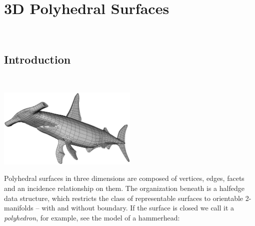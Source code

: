 
\ccParDims

\chapter{3D Polyhedral Surfaces}
\label{chapterPolyhedron}
\\

\vspace*{-15mm}
\minitoc
\vspace*{30mm}


\section{Introduction}
\label{sectionPolyIntro}

\begin{ccTexOnly}
    \vspace*{-50mm}
    \begin{flushright}~\hspace{1cm}
      \parbox{0.5\textwidth}{%
          \includegraphics[width=0.5\textwidth]{fig/shark.ps}%
      }%
    \end{flushright}
\end{ccTexOnly}

Polyhedral surfaces in three dimensions are composed of vertices,
edges, facets and an incidence relationship on them. The organization
beneath is a halfedge data structure, which restricts the class of
representable surfaces to orientable 2-manifolds -- with and without
boundary. If the surface is closed we call it a {\em polyhedron}, for
example, see the  model of a hammerhead:

